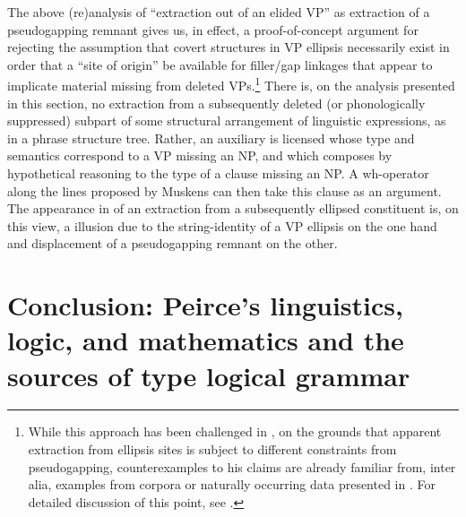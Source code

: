 \documentclass[output=paper,colorlinks,citecolor=brown]{langscibook}
\begin{document}
The above (re)analysis of ``extraction out of an elided VP'' as
extraction of a pseudogapping remnant gives us, in effect, a
proof-of-concept argument for rejecting the assumption that covert
structures in VP ellipsis necessarily exist in order that a ``site of
origin'' be available for filler/gap linkages that appear to implicate
material missing from deleted VPs.\footnote{While this approach has been
challenged in \citet{johnson2001}, on the grounds that apparent extraction
from ellipsis sites is subject to different constraints from
pseudogapping, counterexamples to his claims are already familiar
from, inter alia, examples from corpora or naturally occurring data
presented in \citet{levin-diss}. For detailed discussion of this point, see
\citet[Section~8.4.2]{kubotalevineBook}.} There is, on the analysis
presented in this section, no extraction from a subsequently deleted
(or phonologically suppressed) subpart of some structural arrangement
of linguistic expressions, as in a phrase structure tree. Rather, an
auxiliary is licensed whose type and semantics correspond to a VP
missing an NP, and which composes by hypothetical reasoning to the
type of a clause missing an NP. A wh-operator along the lines
proposed by Muskens can then take this clause as an argument. The
appearance in  of an extraction from a subsequently
ellipsed constituent is, on this view, a illusion due to the
string-identity of a VP ellipsis on the one hand and displacement of a
pseudogapping remnant on the other.

\section{Conclusion: Peirce's linguistics, logic, and mathematics and the sources of type logical grammar}
\end{document}
